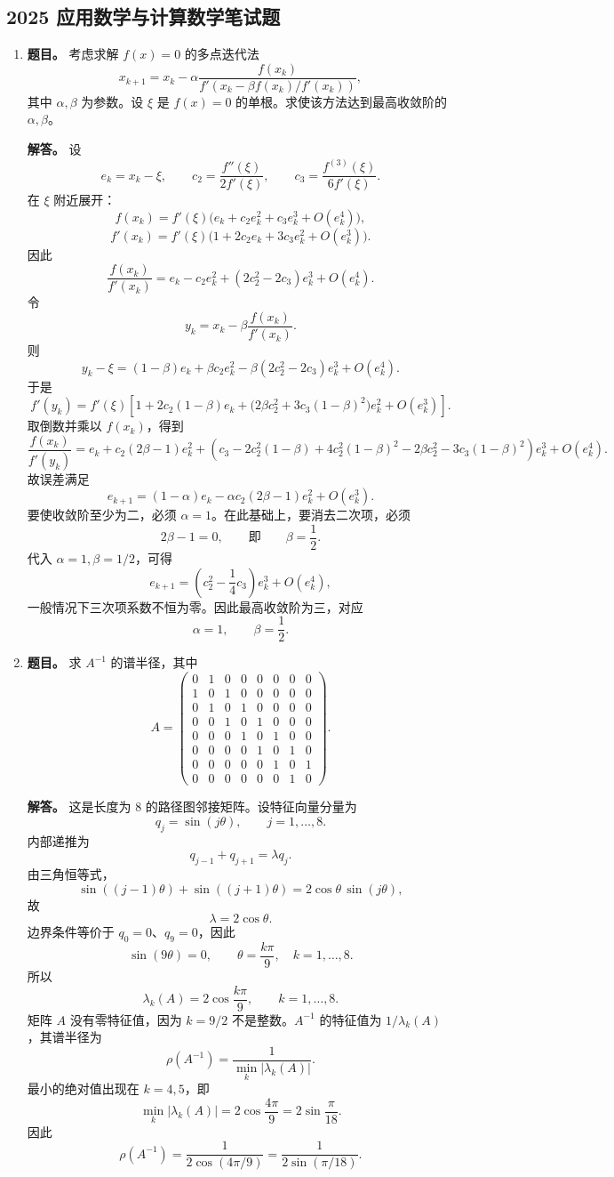 ﻿\documentclass[UTF8,12pt]{ctexart}
\begin{document}
\subsection{2025 应用数学与计算数学笔试题}
\begin{enumerate}[label=\textbf{\arabic*.},leftmargin=2.2em]
\item \textbf{题目。} 考虑求解 \(f(x)=0\) 的多点迭代法
\[
x_{k+1}=x_k-\alpha
\frac{f(x_k)}
{f'\!\left(x_k-\beta f(x_k)/f'(x_k)\right)},
\]
其中 \(\alpha,\beta\) 为参数。设 \(\xi\) 是 \(f(x)=0\) 的单根。求使该方法达到最高收敛阶的 \(\alpha,\beta\)。

\textbf{解答。} 设
\[
e_k=x_k-\xi,\qquad
c_2=\frac{f''(\xi)}{2f'(\xi)},\qquad
c_3=\frac{f^{(3)}(\xi)}{6f'(\xi)}.
\]
在 \(\xi\) 附近展开：
\[
f(x_k)=f'(\xi)\bigl(e_k+c_2e_k^2+c_3e_k^3+O(e_k^4)\bigr),
\]
\[
f'(x_k)=f'(\xi)\bigl(1+2c_2e_k+3c_3e_k^2+O(e_k^3)\bigr).
\]
因此
\[
\frac{f(x_k)}{f'(x_k)}
=e_k-c_2e_k^2+(2c_2^2-2c_3)e_k^3+O(e_k^4).
\]
令
\[
y_k=x_k-\beta\frac{f(x_k)}{f'(x_k)}.
\]
则
\[
y_k-\xi=(1-\beta)e_k+\beta c_2e_k^2-\beta(2c_2^2-2c_3)e_k^3+O(e_k^4).
\]
于是
\[
f'(y_k)=f'(\xi)\left[
1+2c_2(1-\beta)e_k+
\bigl(2\beta c_2^2+3c_3(1-\beta)^2\bigr)e_k^2
+O(e_k^3)\right].
\]
取倒数并乘以 \(f(x_k)\)，得到
\[
\frac{f(x_k)}{f'(y_k)}
=e_k+c_2(2\beta-1)e_k^2+
\left(c_3-2c_2^2(1-\beta)+4c_2^2(1-\beta)^2
-2\beta c_2^2-3c_3(1-\beta)^2\right)e_k^3
+O(e_k^4).
\]
故误差满足
\[
e_{k+1}
=(1-\alpha)e_k-\alpha c_2(2\beta-1)e_k^2+O(e_k^3).
\]
要使收敛阶至少为二，必须 \(\alpha=1\)。在此基础上，要消去二次项，必须
\[
2\beta-1=0,
\qquad\text{即}\qquad
\beta=\frac12.
\]
代入 \(\alpha=1,\beta=1/2\)，可得
\[
e_{k+1}=\left(c_2^2-\frac14c_3\right)e_k^3+O(e_k^4),
\]
一般情况下三次项系数不恒为零。因此最高收敛阶为三，对应
\[
\boxed{\alpha=1,\qquad \beta=\frac12.}
\]

\item \textbf{题目。} 求 \(A^{-1}\) 的谱半径，其中
\[
A=\begin{pmatrix}
0&1&0&0&0&0&0&0\\
1&0&1&0&0&0&0&0\\
0&1&0&1&0&0&0&0\\
0&0&1&0&1&0&0&0\\
0&0&0&1&0&1&0&0\\
0&0&0&0&1&0&1&0\\
0&0&0&0&0&1&0&1\\
0&0&0&0&0&0&1&0
\end{pmatrix}.
\]

\textbf{解答。} 这是长度为 \(8\) 的路径图邻接矩阵。设特征向量分量为
\[
q_j=\sin(j\theta),\qquad j=1,\ldots,8.
\]
内部递推为
\[
q_{j-1}+q_{j+1}=\lambda q_j.
\]
由三角恒等式，
\[
\sin((j-1)\theta)+\sin((j+1)\theta)=2\cos\theta\,\sin(j\theta),
\]
故
\[
\lambda=2\cos\theta.
\]
边界条件等价于 \(q_0=0\)、\(q_9=0\)，因此
\[
\sin(9\theta)=0,\qquad
\theta=\frac{k\pi}{9},\quad k=1,\ldots,8.
\]
所以
\[
\lambda_k(A)=2\cos\frac{k\pi}{9},\qquad k=1,\ldots,8.
\]
矩阵 \(A\) 没有零特征值，因为 \(k=9/2\) 不是整数。\(A^{-1}\) 的特征值为 \(1/\lambda_k(A)\)，其谱半径为
\[
\rho(A^{-1})=\frac1{\min_k|\lambda_k(A)|}.
\]
最小的绝对值出现在 \(k=4,5\)，即
\[
\min_k|\lambda_k(A)|
=2\cos\frac{4\pi}{9}
=2\sin\frac{\pi}{18}.
\]
因此
\[
\boxed{\rho(A^{-1})=\frac1{2\cos(4\pi/9)}
=\frac1{2\sin(\pi/18)}.}
\]


\end{enumerate}
\end{document}
